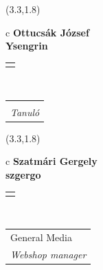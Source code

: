\documentclass[11pt]{article}
\begin{document}
\makebox(3.3,1.8){
  \renewcommand\arraystretch{1.3}
  \begin{tabular}[c]{c}
    \hspace{8.5mm}
    \LARGE\bf{ Ottucsák József }\\
    \hspace{8.5mm}
    \Large{ Ysengrin }\\
    \renewcommand\arraystretch{3}
    \begin{tabular}[c]{c}
      \centering
      \fontfamily{phv}\selectfont{
        \textbf{
          \textsc{
            \scriptsize{
            \color{Dark}{ Ismerkedő }\color{Bright}{ Webmester }\color{Bright}{ Sminkmester }\color{Bright}{ Programozó }
            }
          }
        }
      }
    \end{tabular}
    \\
    \renewcommand\arraystretch{1}
    \begin{tabular}{p{3.3in}}
      \hspace{.7cm}\\
      \hspace{.7cm}\emph{ Tanuló }\\
    \end{tabular}
  \end{tabular}
}

\makebox(3.3,1.8){
  \renewcommand\arraystretch{1.3}
  \begin{tabular}[c]{c}
    \hspace{8.5mm}
    \LARGE\bf{ Szatmári Gergely }\\
    \hspace{8.5mm}
    \Large{ szgergo }\\
    \renewcommand\arraystretch{3}
    \begin{tabular}[c]{c}
      \centering
      \fontfamily{phv}\selectfont{
        \textbf{
          \textsc{
            \scriptsize{
            \color{Dark}{ Ismerkedő }\color{Bright}{ Webmester }\color{Bright}{ Sminkmester }\color{Bright}{ Programozó }
            }
          }
        }
      }
    \end{tabular}
    \\
    \renewcommand\arraystretch{1}
    \begin{tabular}{p{3.3in}}
      \hspace{.7cm}General Media\\
      \hspace{.7cm}\emph{ Webshop manager }\\
    \end{tabular}
  \end{tabular}
}
\end{document}
